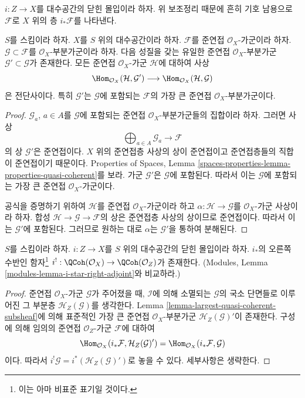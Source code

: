\noindent
$i : Z \to X$를 대수공간의 닫힌 몰입이라 하자.
위 보조정리 때문에 흔히 기호 남용으로
$\mathcal{F}$로 $X$ 위의 층 $i_*\mathcal{F}$를 나타낸다.

\begin{lemma}
\label{lemma-largest-quasi-coherent-subsheaf}
$S$를 스킴이라 하자. $X$를 $S$ 위의 대수공간이라 하자.
$\mathcal{F}$를 준연접 $\mathcal{O}_X$-가군이라 하자.
$\mathcal{G} \subset \mathcal{F}$를 $\mathcal{O}_X$-부분가군이라 하자.
다음 성질을 갖는 유일한 준연접 $\mathcal{O}_X$-부분가군
$\mathcal{G}' \subset \mathcal{G}$가 존재한다.
모든 준연접 $\mathcal{O}_X$-가군 $\mathcal{H}$에 대하여 사상
$$
\Hom_{\mathcal{O}_X}(\mathcal{H}, \mathcal{G}')
\longrightarrow
\Hom_{\mathcal{O}_X}(\mathcal{H}, \mathcal{G})
$$
은 전단사이다. 특히 $\mathcal{G}'$는 $\mathcal{G}$에 포함되는
$\mathcal{F}$의 가장 큰 준연접 $\mathcal{O}_X$-부분가군이다.
\end{lemma}

\begin{proof}
$\mathcal{G}_a$, $a \in A$를 $\mathcal{G}$에 포함되는 준연접
$\mathcal{O}_X$-부분가군들의 집합이라 하자. 그러면 사상
$$
\bigoplus\nolimits_{a \in A} \mathcal{G}_a \longrightarrow \mathcal{F}
$$
의 상 $\mathcal{G}'$은 준연접이다. $X$ 위의 준연접층 사상의 상이
준연접이고 준연접층들의 직합이 준연접이기 때문이다.
Properties of Spaces, Lemma
\ref{spaces-properties-lemma-properties-quasi-coherent}를 보라.
가군 $\mathcal{G}'$은 $\mathcal{G}$에 포함된다. 따라서 이는
$\mathcal{G}$에 포함되는 가장 큰 준연접 $\mathcal{O}_X$-가군이다.

\medskip\noindent
공식을 증명하기 위하여 $\mathcal{H}$를 준연접
$\mathcal{O}_X$-가군이라 하고 $\alpha : \mathcal{H} \to \mathcal{G}$를
$\mathcal{O}_X$-가군 사상이라 하자. 합성
$\mathcal{H} \to \mathcal{G} \to \mathcal{F}$의 상은 준연접층
사상의 상이므로 준연접이다. 따라서 이는 $\mathcal{G}'$에 포함된다.
그러므로 원하는 대로 $\alpha$는 $\mathcal{G}'$을 통하여 분해된다.
\end{proof}

\begin{lemma}
\label{lemma-i-upper-shriek}
$S$를 스킴이라 하자.
$i : Z \to X$를 $S$ 위의 대수공간의 닫힌 몰입이라 하자.
$i_*$의 오른쪽 수반인 함자\footnote{이는 아마 비표준 표기일 것이다.}
$i^! : \QCoh(\mathcal{O}_X) \to \QCoh(\mathcal{O}_Z)$가 존재한다.
(Modules, Lemma \ref{modules-lemma-i-star-right-adjoint}와 비교하라.)
\end{lemma}

\begin{proof}
준연접 $\mathcal{O}_X$-가군 $\mathcal{G}$가 주어졌을 때,
$\mathcal{I}$에 의해 소멸되는 $\mathcal{G}$의 국소 단면들로 이루어진
그 부분층 $\mathcal{H}_Z(\mathcal{G})$를 생각한다.
Lemma \ref{lemma-largest-quasi-coherent-subsheaf}에 의해 표준적인
가장 큰 준연접 $\mathcal{O}_X$-부분가군
$\mathcal{H}_Z(\mathcal{G})'$이 존재한다. 구성에 의해 임의의 준연접
$\mathcal{O}_Z$-가군 $\mathcal{F}$에 대하여
$$
\Hom_{\mathcal{O}_X}(i_*\mathcal{F}, \mathcal{H}_Z(\mathcal{G})')
=
\Hom_{\mathcal{O}_X}(i_*\mathcal{F}, \mathcal{G})
$$
이다. 따라서 $i^!\mathcal{G} = i^*(\mathcal{H}_Z(\mathcal{G})')$로
놓을 수 있다. 세부사항은 생략한다.
\end{proof}

